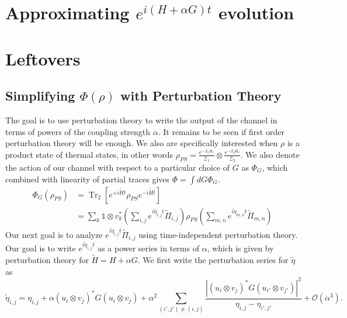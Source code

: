 \documentclass{article}
\newcommand{\parens}[1]{\left( #1 \right)}
\newcommand{\brackets}[1]{\left[ #1 \right]}
\newcommand{\abs}[1]{\left| #1 \right|}
\newcommand{\openone}{\mathds{1}}
\newcommand{\bigo}[1]{\mathcal{O}\left( #1 \right)}
\DeclareMathOperator{\Tr}{Tr}
\newcommand{\partrace}[2]{\Tr_{#1} \brackets{ #2 }}
\newcommand{\partfun}{\mathcal{Z}}
\begin{document}
\section{Approximating $e^{i (H + \alpha G) t}$ evolution}


\section{Leftovers}
\subsection{Simplifying $\Phi(\rho)$ with Perturbation Theory}
The goal is to use perturbation theory to write the output of the channel in terms of powers of the coupling strength $\alpha$. It remains to be seen if first order perturbation theory will be enough. We also are specifically interested when $\rho$ is a product state of thermal states, in other words $\rho_{PS} = \frac{e^{-\beta_1 H_1}}{\partfun_1} \otimes \frac{e^{-\beta_2 H_2}}{\partfun_2}$. We also denote the action of our channel with respect to a particular choice of $G$ as $\Phi_G$, which combined with linearity of partial traces gives $\Phi = \int dG \Phi_G$. 
\begin{align}
    \Phi_G(\rho_{PS}) &= \partrace{2}{e^{+i \widetilde{H} t} \rho_{PS} e^{-i \widetilde{H} t}} \\
    &= \sum_{k} \openone \otimes v_k^* \parens{\sum_{i, j} e^{i \widetilde{\eta}_{i, j} t} \widetilde{\Pi}_{i,j}} \rho_{PS} \parens{ \sum_{m, n} e^{i \widetilde{\eta}_{m, n} t} \widetilde{\Pi}_{m,n} }
\end{align}
Our next goal is to analyze $e^{i \widetilde{\eta}_{i,j} t} \widetilde{\Pi}_{i,j}$ using time-independent perturbation theory. Our goal is to write $e^{i \widetilde{\eta}_{i,j} t}$ as a power series in terms of $\alpha$, which is given by perturbation theory for $\widetilde{H} = H + \alpha G$. We first write the perturbation series for $\widetilde{\eta}$ as 
\begin{equation}
    \widetilde{\eta}_{i,j} = \eta_{i,j} + \alpha (u_i \otimes v_j)^* G (u_i \otimes v_j) + \alpha^2 \sum_{(i',j') \neq (i,j)}  \frac{\abs{(u_i \otimes v_j)^* G (u_{i'} \otimes v_{j'})}^{2}}{\eta_{i,j} - \eta_{i',j'}} + \bigo{\alpha^3}.
\end{equation}
\end{document}
